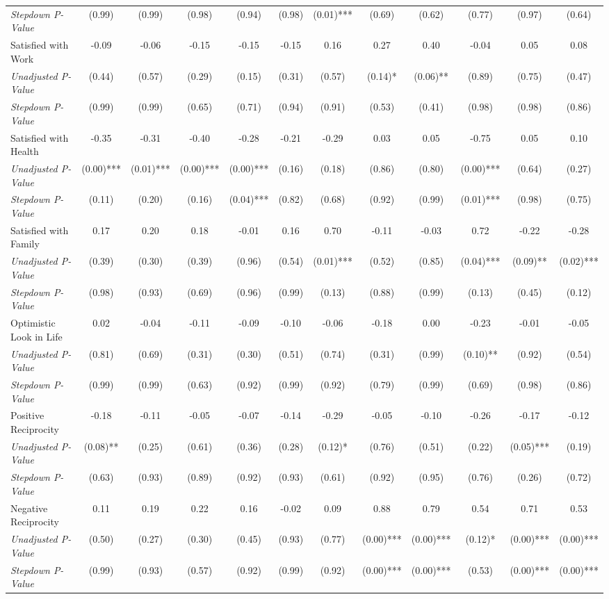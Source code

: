 \begin{tabular}{l c c c c c c c c c c c}
\quad \textit{Stepdown P-Value} & (0.99) & (0.99) & (0.98) & (0.94) & (0.98) & (0.01)*** & (0.69) & (0.62) & (0.77) & (0.97) & (0.64) \\
Satisfied with Work & -0.09 & -0.06 & -0.15 & -0.15 & -0.15 & 0.16 & 0.27 & 0.40 & -0.04 & 0.05 & 0.08 \\
\quad \textit{Unadjusted P-Value} & (0.44) & (0.57) & (0.29) & (0.15) & (0.31) & (0.57) & (0.14)* & (0.06)** & (0.89) & (0.75) & (0.47) \\
\quad \textit{Stepdown P-Value} & (0.99) & (0.99) & (0.65) & (0.71) & (0.94) & (0.91) & (0.53) & (0.41) & (0.98) & (0.98) & (0.86) \\
Satisfied with Health & -0.35 & -0.31 & -0.40 & -0.28 & -0.21 & -0.29 & 0.03 & 0.05 & -0.75 & 0.05 & 0.10 \\
\quad \textit{Unadjusted P-Value} & (0.00)*** & (0.01)*** & (0.00)*** & (0.00)*** & (0.16) & (0.18) & (0.86) & (0.80) & (0.00)*** & (0.64) & (0.27) \\
\quad \textit{Stepdown P-Value} & (0.11) & (0.20) & (0.16) & (0.04)*** & (0.82) & (0.68) & (0.92) & (0.99) & (0.01)*** & (0.98) & (0.75) \\
Satisfied with Family & 0.17 & 0.20 & 0.18 & -0.01 & 0.16 & 0.70 & -0.11 & -0.03 & 0.72 & -0.22 & -0.28 \\
\quad \textit{Unadjusted P-Value} & (0.39) & (0.30) & (0.39) & (0.96) & (0.54) & (0.01)*** & (0.52) & (0.85) & (0.04)*** & (0.09)** & (0.02)*** \\
\quad \textit{Stepdown P-Value} & (0.98) & (0.93) & (0.69) & (0.96) & (0.99) & (0.13) & (0.88) & (0.99) & (0.13) & (0.45) & (0.12) \\
Optimistic Look in Life & 0.02 & -0.04 & -0.11 & -0.09 & -0.10 & -0.06 & -0.18 & 0.00 & -0.23 & -0.01 & -0.05 \\
\quad \textit{Unadjusted P-Value} & (0.81) & (0.69) & (0.31) & (0.30) & (0.51) & (0.74) & (0.31) & (0.99) & (0.10)** & (0.92) & (0.54) \\
\quad \textit{Stepdown P-Value} & (0.99) & (0.99) & (0.63) & (0.92) & (0.99) & (0.92) & (0.79) & (0.99) & (0.69) & (0.98) & (0.86) \\
Positive Reciprocity & -0.18 & -0.11 & -0.05 & -0.07 & -0.14 & -0.29 & -0.05 & -0.10 & -0.26 & -0.17 & -0.12 \\
\quad \textit{Unadjusted P-Value} & (0.08)** & (0.25) & (0.61) & (0.36) & (0.28) & (0.12)* & (0.76) & (0.51) & (0.22) & (0.05)*** & (0.19) \\
\quad \textit{Stepdown P-Value} & (0.63) & (0.93) & (0.89) & (0.92) & (0.93) & (0.61) & (0.92) & (0.95) & (0.76) & (0.26) & (0.72) \\
Negative Reciprocity & 0.11 & 0.19 & 0.22 & 0.16 & -0.02 & 0.09 & 0.88 & 0.79 & 0.54 & 0.71 & 0.53 \\
\quad \textit{Unadjusted P-Value} & (0.50) & (0.27) & (0.30) & (0.45) & (0.93) & (0.77) & (0.00)*** & (0.00)*** & (0.12)* & (0.00)*** & (0.00)*** \\
\quad \textit{Stepdown P-Value} & (0.99) & (0.93) & (0.57) & (0.92) & (0.99) & (0.92) & (0.00)*** & (0.00)*** & (0.53) & (0.00)*** & (0.00)*** \\
\bottomrule
\end{tabular}
